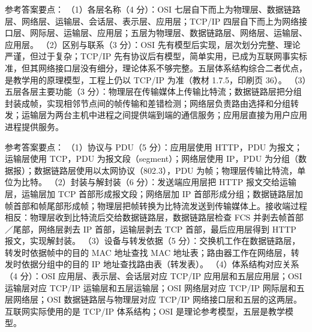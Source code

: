 \documentclass[a4paper,11pt]{article}
\begin{document}
\q 参考答案要点：
（1）各层名称（4 分）：OSI 七层自下而上为物理层、数据链路层、网络层、运输层、会话层、表示层、应用层；TCP/IP 四层自下而上为网络接口层、网际层、运输层、应用层；五层为物理层、数据链路层、网络层、运输层、应用层。
（2）区别与联系（3 分）：OSI 先有模型后实现，层次划分完整、理论严谨，但过于复杂；TCP/IP 先有协议后有模型，简单实用，已成为互联网事实标准，但其网络接口层没有细分，理论体系不够完整。五层体系结构综合二者优点，是教学用的原理模型，工程上仍以 TCP/IP 为准（教材 1.7.5，印刷页 36）。
（3）五层各层主要功能（3 分）：物理层在传输媒体上传输比特流；数据链路层把分组封装成帧，实现相邻节点间的帧传输和差错检测；网络层负责路由选择和分组转发；运输层为两台主机中进程之间提供端到端的通信服务；应用层直接为用户应用进程提供服务。


\q 参考答案要点：
（1）协议与 PDU（5 分）：应用层使用 HTTP，PDU 为报文；运输层使用 TCP，PDU 为报文段（segment）；网络层使用 IP，PDU 为分组（数据报）；数据链路层使用以太网协议（802.3），PDU 为帧；物理层传输比特流，单位为比特。
（2）封装与解封装（6 分）：发送端应用层把 HTTP 报文交给运输层，运输层加 TCP 首部形成报文段；网络层加 IP 首部形成分组；数据链路层加帧首部和帧尾部形成帧；物理层把帧转换为比特流发送到传输媒体上。接收端过程相反：物理层收到比特流后交给数据链路层，数据链路层检查 FCS 并剥去帧首部／尾部，网络层剥去 IP 首部，运输层剥去 TCP 首部，最后应用层得到 HTTP 报文，实现解封装。
（3）设备与转发依据（5 分）：交换机工作在数据链路层，转发时依据帧中的目的 MAC 地址查找 MAC 地址表；路由器工作在网络层，转发时依据分组中的目的 IP 地址查找路由表（转发表）。
（4）体系结构对应关系（4 分）：OSI 应用层、表示层、会话层对应 TCP/IP 应用层和五层应用层；OSI 运输层对应 TCP/IP 运输层和五层运输层；OSI 网络层对应 TCP/IP 网际层和五层网络层；OSI 数据链路层与物理层对应 TCP/IP 网络接口层和五层的这两层。互联网实际使用的是 TCP/IP 体系结构；OSI 是理论参考模型，五层是教学模型。
\end{document}

